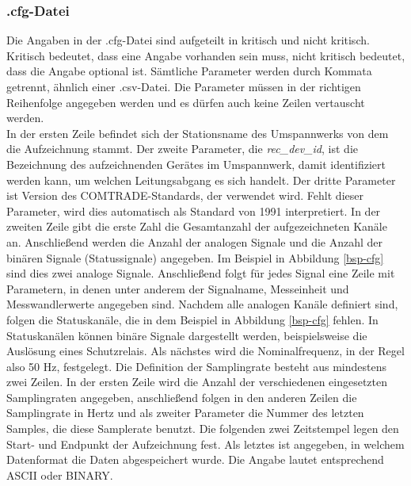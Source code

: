 \documentclass{scrartcl}
\begin{document}
\begin{onehalfspace}
\subsubsection{.cfg-Datei}
Die Angaben in der .cfg-Datei sind aufgeteilt in \glqq kritisch\grqq{} und \glqq nicht kritisch\grqq. \glqq Kritisch\grqq{} bedeutet, dass eine Angabe vorhanden sein muss, \glqq nicht kritisch\grqq{} bedeutet, dass die Angabe optional ist. Sämtliche Parameter werden durch Kommata getrennt, ähnlich einer .csv-Datei. Die Parameter müssen in der richtigen Reihenfolge angegeben werden und es dürfen auch keine Zeilen vertauscht werden. \\
In der ersten Zeile befindet sich der Stationsname des Umspannwerks von dem die Aufzeichnung stammt. Der zweite Parameter, die \textit{rec\_dev\_id}, ist die Bezeichnung des aufzeichnenden Gerätes im Umspannwerk, damit identifiziert werden kann, um welchen Leitungsabgang es sich handelt. Der dritte Parameter ist Version des COMTRADE-Standards, der verwendet wird. Fehlt dieser Parameter, wird dies automatisch als Standard von 1991 interpretiert. In der zweiten Zeile gibt die erste Zahl die Gesamtanzahl der aufgezeichneten Kanäle an. Anschließend werden die Anzahl der analogen Signale und die Anzahl der binären Signale (Statussignale) angegeben. Im Beispiel in Abbildung \ref{bsp-cfg} sind dies zwei analoge Signale. Anschließend folgt für jedes Signal eine Zeile mit Parametern, in denen unter anderem der Signalname, Messeinheit und Messwandlerwerte angegeben sind. Nachdem alle analogen Kanäle definiert sind, folgen die Statuskanäle, die in dem Beispiel in Abbildung \ref{bsp-cfg} fehlen. In Statuskanälen können binäre Signale dargestellt werden, beispielsweise die Auslösung eines Schutzrelais. Als nächstes wird die Nominalfrequenz, in der Regel also 50 Hz, festgelegt. Die Definition der Samplingrate besteht aus mindestens zwei Zeilen. In der ersten Zeile wird die Anzahl der verschiedenen eingesetzten Samplingraten angegeben, anschließend folgen in den anderen Zeilen die Samplingrate in Hertz und als zweiter Parameter die Nummer des letzten Samples, die diese Samplerate benutzt. Die folgenden zwei Zeitstempel legen den Start- und Endpunkt der Aufzeichnung fest. Als letztes ist angegeben, in welchem Datenformat die Daten abgespeichert wurde. Die Angabe lautet entsprechend \glqq ASCII\grqq{} oder \glqq BINARY\grqq.


\end{onehalfspace}
\end{document}
